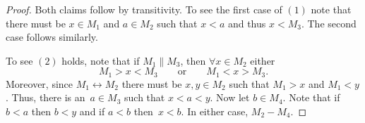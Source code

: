 \documentclass[10pt,a4paper]{amsart}
\begin{document}
\begin{proof}
Both claims follow by transitivity.  
To see the first case of $(1)$ note that there must be $x\in M_1$ and $a\in M_2$ such that $x<a$ and thus $x<M_3$.
The second case follows similarly.


To see $(2)$ holds, note that if $M_1 \parallel M_3$, then $\forall x\in M_2$ either 
\[M_1>x<M_3 \quad\quad\text{or}\quad\quad M_1<x>M_3.\]
Moreover, since $M_1\leftrightarrow M_2$ there must be $x,y\in M_2$ such that $M_1>x$ and $M_1<y$.  Thus, there is an~$a\in M_3$ such that $x<a<y$. 
Now let $b\in M_4$. Note that if $b<a$ then $b<y$ 
and if $a<b$ then~$x<b$. In either case, $M_2 - M_4$.
\end{proof}
\end{document}
